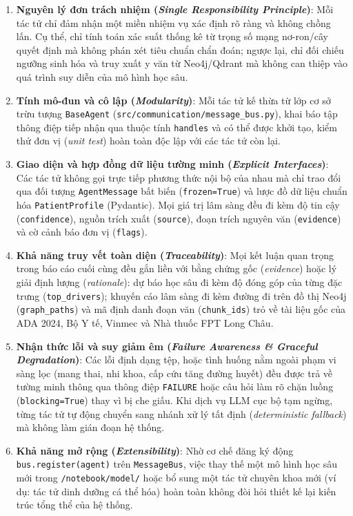 \begin{enumerate}
  \item \textbf{Nguyên lý đơn trách nhiệm (\emph{Single Responsibility Principle})}:
  Mỗi tác tử chỉ đảm nhận một miền nhiệm vụ xác định rõ ràng và không chồng lấn. Cụ thể,  chỉ tính toán xác suất thống kê từ trọng số mạng nơ-ron/cây quyết định mà không phán xét tiêu chuẩn chẩn đoán; ngược lại,  chỉ đối chiếu ngưỡng sinh hóa và truy xuất y văn từ Neo4j/Qdrant mà không can thiệp vào quá trình suy diễn của mô hình học sâu.

  \item \textbf{Tính mô-đun và cô lập (\emph{Modularity})}:
  Mỗi tác tử kế thừa từ lớp cơ sở trừu tượng \texttt{BaseAgent} (\texttt{src/communication/message\_bus.py}), khai báo tập thông điệp tiếp nhận qua thuộc tính \texttt{handles} và có thể được khởi tạo, kiểm thử đơn vị (\emph{unit test}) hoàn toàn độc lập với các tác tử còn lại.

  \item \textbf{Giao diện và hợp đồng dữ liệu tường minh (\emph{Explicit Interfaces})}:
  Các tác tử không gọi trực tiếp phương thức nội bộ của nhau mà chỉ trao đổi qua đối tượng \texttt{AgentMessage} bất biến (\texttt{frozen=True}) và lược đồ dữ liệu chuẩn hóa \texttt{PatientProfile} (Pydantic). Mọi giá trị lâm sàng đều đi kèm độ tin cậy (\texttt{confidence}), nguồn trích xuất (\texttt{source}), đoạn trích nguyên văn (\texttt{evidence}) và cờ cảnh báo đơn vị (\texttt{flags}).

  \item \textbf{Khả năng truy vết toàn diện (\emph{Traceability})}:
  Mọi kết luận quan trọng trong báo cáo cuối cùng đều gắn liền với bằng chứng gốc (\emph{evidence}) hoặc lý giải định lượng (\emph{rationale}): dự báo học sâu đi kèm độ đóng góp của từng đặc trưng (\texttt{top\_drivers}); khuyến cáo lâm sàng đi kèm đường đi trên đồ thị Neo4j (\texttt{graph\_paths}) và mã định danh đoạn văn (\texttt{chunk\_ids}) trỏ về tài liệu gốc của ADA 2024, Bộ Y tế, Vinmec và Nhà thuốc FPT Long Châu.

  \item \textbf{Nhận thức lỗi và suy giảm êm (\emph{Failure Awareness \& Graceful Degradation})}:
  Các lỗi định dạng tệp,  hoặc tình huống nằm ngoài phạm vi sàng lọc (mang thai, nhi khoa, cấp cứu tăng đường huyết) đều được trả về tường minh thông qua thông điệp \texttt{FAILURE} hoặc câu hỏi làm rõ chặn luồng (\texttt{blocking=True}) thay vì bị che giấu. Khi dịch vụ LLM cục bộ tạm ngừng, từng tác tử tự động chuyển sang nhánh xử lý tất định (\emph{deterministic fallback}) mà không làm gián đoạn hệ thống.

  \item \textbf{Khả năng mở rộng (\emph{Extensibility})}:
  Nhờ cơ chế đăng ký động \texttt{bus.register(agent)} trên \texttt{MessageBus}, việc thay thế một mô hình học sâu mới trong \texttt{/notebook/model/} hoặc bổ sung một tác tử chuyên khoa mới (ví dụ: tác tử dinh dưỡng cá thể hóa) hoàn toàn không đòi hỏi thiết kế lại kiến trúc tổng thể của hệ thống.
\end{enumerate}
